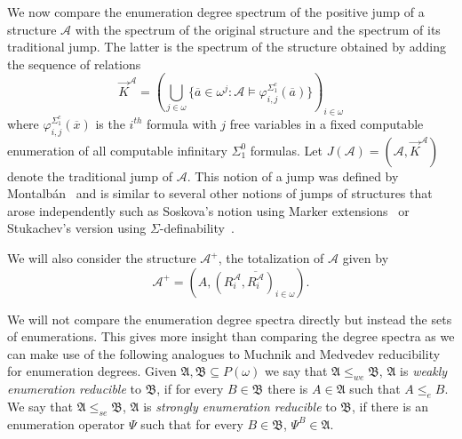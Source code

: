 \documentclass[11pt]{amsart}
\newcommand{\A}{{\mathcal{A}}}
\newcommand{\N}{\omega}
\newcommand{\mf}[1]{\mathfrak{#1}}
\renewcommand{\bar}[1]{\overline{#1}}
\renewcommand{\phi}{\varphi}
\begin{document}
We now compare the enumeration degree spectrum of the positive jump of a structure $\A$ with the spectrum of the original structure and the spectrum of its traditional jump. The latter is the spectrum of the structure obtained by adding the sequence of relations
\[  \vec K^{\A} = (\bigcup_{j\in\omega}\{ \bar a\in \omega^j : \A\models \phi_{i,j}^{\Sigma_1^c}(\bar a)\})_{i\in\omega} \]
where $\phi_{i,j}^{\Sigma_1^c}(\bar x)$ is the $i^{th}$ formula with $j$ free variables in a fixed computable enumeration of all computable infinitary $\Sigma_1^0$ formulas.
Let $J(\A)=(\A,\vec K^{\A})$ denote the traditional jump of $\A$. This notion of a jump was defined by Montalb\'an~\cite{montalban2012} and is similar to several other notions of jumps of structures that arose independently such as Soskova's notion using Marker extensions~\cite{soskova2009} or Stukachev's version using $\Sigma$-definability~\cite{stukachev2007}.  

We will also consider the structure $\A^+$, the totalization of $\A$ given by
\[ \A^+=(A,(R_i^\A,\bar{ R_i^\A})_{i\in\omega}).\]

We will not compare the enumeration degree spectra directly but instead the sets of enumerations. This gives more insight than comparing the degree spectra as we can make use of the following analogues to Muchnik and Medvedev reducibility for enumeration degrees. Given $\mf A,\mf B\subseteq P(\N)$ we say that $\mf A\leq_{we} \mf B$, $\mf A$ is \emph{weakly enumeration reducible} to $\mf B$, if for every $B\in \mf B$ there is $A\in \mf A$ such that $A\leq_e B$. We say that $\mf A\leq_{se}\mf B$, $\mf A$ is \emph{strongly enumeration reducible} to $\mf B$, if there is an enumeration operator $\Psi$ such that for every $B\in\mf B$, $\Psi^B\in \mf A$.
\end{document}
